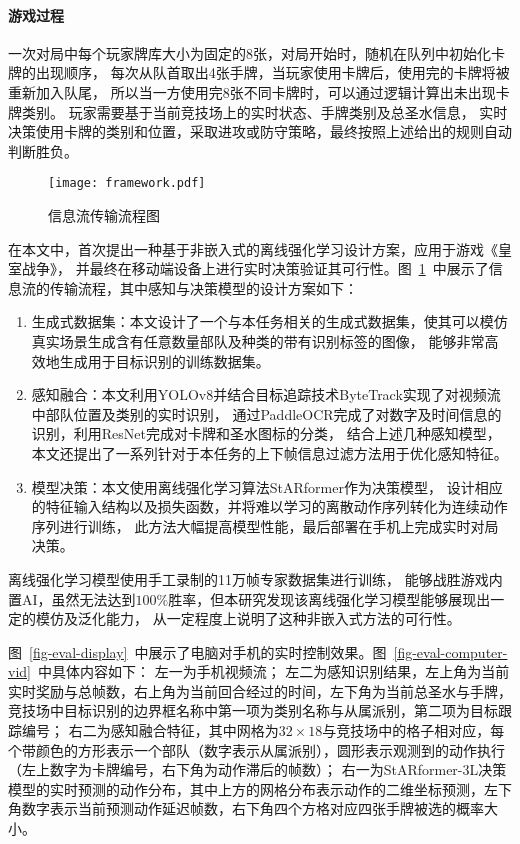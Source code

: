 \paragraph*{游戏过程}一次对局中每个玩家牌库大小为固定的8张，对局开始时，随机在队列中初始化卡牌的出现顺序，
每次从队首取出4张手牌，当玩家使用卡牌后，使用完的卡牌将被重新加入队尾，
所以当一方使用完8张不同卡牌时，可以通过逻辑计算出未出现卡牌类别。
玩家需要基于当前竞技场上的实时状态、手牌类别及总圣水信息，
实时决策使用卡牌的类别和位置，采取进攻或防守策略，最终按照上述给出的规则自动判断胜负。

\begin{figure}[htbp]
  \centering\vspace{-3ex}
  \texttt{[image: framework.pdf]}
  \caption{信息流传输流程图}\label{fig-framework}
\end{figure}
在本文中，首次提出一种基于非嵌入式的离线强化学习设计方案，应用于游戏《皇室战争》，
并最终在移动端设备上进行实时决策验证其可行性。图~\ref{fig-framework}~中展示了信息流的传输流程，其中感知与决策模型的设计方案如下：
\begin{enumerate}
  \item 生成式数据集：本文设计了一个与本任务相关的生成式数据集，使其可以模仿真实场景生成含有任意数量部队及种类的带有识别标签的图像，
  能够非常高效地生成用于目标识别的训练数据集。
  \item 感知融合：本文利用YOLOv8并结合目标追踪技术ByteTrack实现了对视频流中部队位置及类别的实时识别，
  通过PaddleOCR完成了对数字及时间信息的识别，利用ResNet完成对卡牌和圣水图标的分类，
  结合上述几种感知模型，本文还提出了一系列针对于本任务的上下帧信息过滤方法用于优化感知特征。
  \item 模型决策：本文使用离线强化学习算法StARformer作为决策模型，
  设计相应的特征输入结构以及损失函数，并将难以学习的离散动作序列转化为连续动作序列进行训练，
  此方法大幅提高模型性能，最后部署在手机上完成实时对局决策。
\end{enumerate}

离线强化学习模型使用手工录制的11万帧专家数据集进行训练，
能够战胜游戏内置AI，虽然无法达到$100\%$胜率，但本研究发现该离线强化学习模型能够展现出一定的模仿及泛化能力，
从一定程度上说明了这种非嵌入式方法的可行性。

图~\ref{fig-eval-display}~中展示了电脑对手机的实时控制效果。图~\ref{fig-eval-computer-vid}~中具体内容如下：
左一为手机视频流；
左二为感知识别结果，左上角为当前实时奖励与总帧数，右上角为当前回合经过的时间，左下角为当前总圣水与手牌，竞技场中目标识别的边界框名称中第一项为类别名称与从属派别，第二项为目标跟踪编号；
右二为感知融合特征，其中网格为$32\times 18$与竞技场中的格子相对应，每个带颜色的方形表示一个部队（数字表示从属派别），圆形表示观测到的动作执行（左上数字为卡牌编号，右下角为动作滞后的帧数）；
右一为StARformer-3L决策模型的实时预测的动作分布，其中上方的网格分布表示动作的二维坐标预测，左下角数字表示当前预测动作延迟帧数，右下角四个方格对应四张手牌被选的概率大小。

